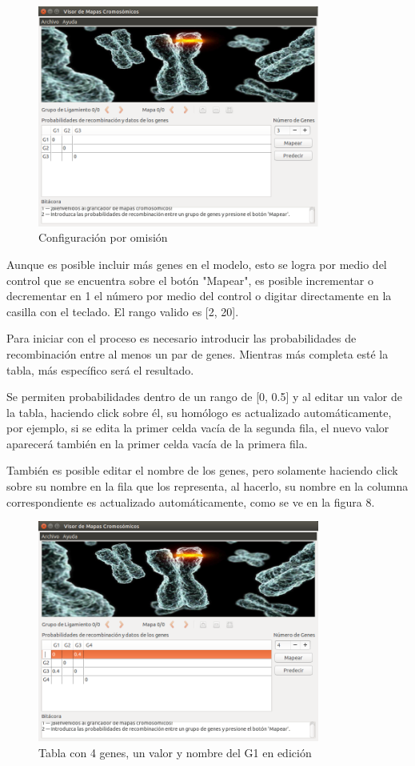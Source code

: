 \documentclass{article}
\begin{document}
	\begin{figure}[h!]
	  \begin{center}
	    \includegraphics[width=350px, keepaspectratio=false]{report1}
	  \end{center}
	  \caption{Configuración por omisión}
	\end{figure}
	
	Aunque es posible incluir más genes en el modelo, esto se logra por medio del control que se encuentra sobre el botón "Mapear", es posible incrementar o decrementar en 1 el número por medio del control o digitar directamente en la casilla con el teclado. El rango valido es [2, 20].
	
	Para iniciar con el proceso es necesario introducir las probabilidades de recombinación entre al menos un par de genes. Mientras más completa esté la tabla, más específico será el resultado.
	
	Se permiten probabilidades dentro de un rango de [0, 0.5] y al editar un valor de la tabla, haciendo click sobre él, su homólogo es actualizado automáticamente, por ejemplo, si se edita la primer celda vacía de la segunda fila, el nuevo valor aparecerá también en la primer celda vacía de la primera fila.
	
	También es posible editar el nombre de los genes, pero solamente haciendo click sobre su nombre en la fila que los representa, al hacerlo, su nombre en la columna correspondiente es actualizado automáticamente, como se ve en la figura 8.
	
	\begin{figure}[h!]
		\centering
			\includegraphics[width=350px, keepaspectratio=false]{report2}
				\caption{Tabla con 4 genes, un valor y nombre del G1 en edición}
	\end{figure}
	
\end{document}
